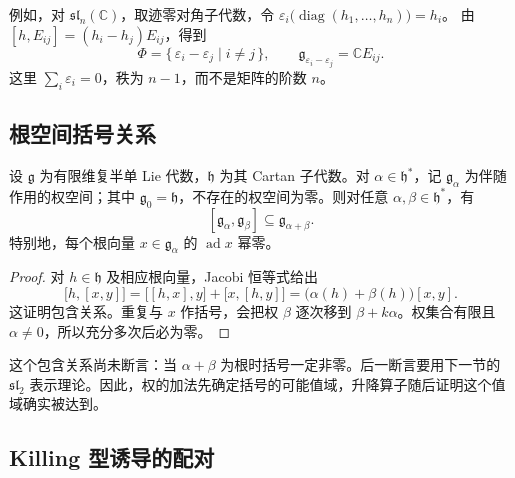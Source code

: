 例如，对 \(\mathfrak{sl}_n(\mathbb C)\)，取迹零对角子代数，令 \(\varepsilon_i\bigl(\operatorname{diag}(h_1,\ldots,h_n)\bigr)=h_i\)。 由 \([h,E_{ij}]=(h_i-h_j)E_{ij}\)，得到
\[
	\Phi=\{\,\varepsilon_i-\varepsilon_j\mid i\ne j\,\},\qquad \mathfrak g_{\varepsilon_i-\varepsilon_j}=\mathbb CE_{ij}.
\]
这里 \(\sum_i\varepsilon_i=0\)，秩为 \(n-1\)，而不是矩阵的阶数 \(n\)。

\subsection{根空间括号关系}
\label{b5:subsec:1602:02}

\begin{proposition}\label{b5:prop:root-space-bracket}
	设 \(\mathfrak g\) 为有限维复半单 Lie 代数，\(\mathfrak h\) 为其 Cartan 子代数。对 \(\alpha\in\mathfrak h^*\)，记 \(\mathfrak g_\alpha\) 为伴随作用的权空间；其中 \(\mathfrak g_0=\mathfrak h\)，不存在的权空间为零。则对任意 \(\alpha,\beta\in\mathfrak h^*\)，有
	\[
		[\mathfrak g_\alpha,\mathfrak g_\beta] \subseteq\mathfrak g_{\alpha+\beta}.
	\]
	特别地，每个根向量 \(x\in\mathfrak g_\alpha\) 的 \(\operatorname{ad}x\) 幂零。
\end{proposition}
\begin{proof}
	对 \(h\in\mathfrak h\) 及相应根向量，Jacobi 恒等式给出
	\[
		\bigl[h,[x,y]\bigr]=\bigl[[h,x],y\bigr]+\bigl[x,[h,y]\bigr] =\bigl(\alpha(h)+\beta(h)\bigr)[x,y].
	\]
	这证明包含关系。重复与 \(x\) 作括号，会把权 \(\beta\) 逐次移到 \(\beta+k\alpha\)。权集合有限且 \(\alpha\ne0\)，所以充分多次后必为零。
\end{proof}

这个包含关系尚未断言：当 \(\alpha+\beta\) 为根时括号一定非零。后一断言要用下一节的 \(\mathfrak{sl}_2\) 表示理论。因此，权的加法先确定括号的可能值域，升降算子随后证明这个值域确实被达到。

\subsection{Killing 型诱导的配对}
\label{b5:subsec:1602:03}

